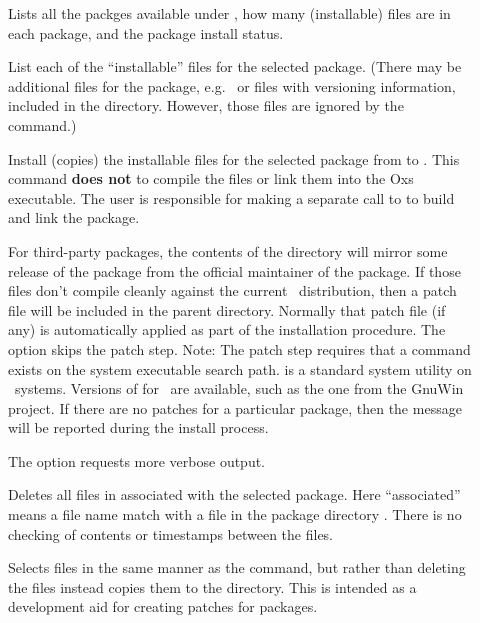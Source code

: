 \begin{description}
\item[]
  Lists all the packges available under
  , how many (installable) files are in
  each package, and the package install status.
\item[]
  List each of the ``installable'' files for the selected package.
  (There may be additional files for the package, e.g.\  or
  files with versioning information, included in the
   directory.  However, those
  files are ignored by the  command.)
\item[]
  Install (copies) the installable files for the selected package
  from  to .
  This command \textbf{does not} to compile the files or link them
  into the Oxs executable.  The user is responsible for making a
  separate call to 
  to build and link the package.

  For third-party packages, the contents of the
   directory will mirror some
  release of the package from the official maintainer of the package.
  If those files don't compile cleanly against the current
  \OOMMF\ distribution, then a patch file will be included in the
  parent  directory.  Normally that patch
  file (if any) is automatically applied as part of the installation
  procedure.  The  option skips the patch step.  Note:
  The patch step requires that a  command exists on the
  system executable search path.   is a standard system
  utility on \Unix\ systems.  Versions of  for \Windows\ are
  available, such as the one from the GnuWin project.  If there are no
  patches for a particular package, then the message  will be reported during the install process.

  The  option requests more verbose output.
\item[]
 Deletes all files in  associated with the
 selected package.  Here ``associated'' means a file name match with a
 file in the package directory .
 There is no checking of contents or timestamps between the files.
\item[]
  Selects files in the same manner as the  command, but
  rather than deleting the files instead copies them to the
   directory.  This is intended as a development aid
  for creating patches for packages.
\end{description}

